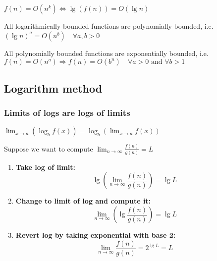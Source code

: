 \documentclass{article}
\begin{document}
\begin{theorem}
    $f(n) = O(n^k) \Leftrightarrow \lg(f(n)) = O(\lg n)$
\end{theorem}

\begin{theorem}
    All logarithmically bounded functions are polynomially bounded, i.e. \((\lg n)^a = O(n^b) \quad \forall a, b > 0\)
\end{theorem}

\begin{theorem}
    All polynomially bounded functions are exponentially bounded, i.e. \( f(n) = O(n^a) \Rightarrow f(n) = O(b^n) \quad \forall a > 0 \text{ and } \forall b > 1\)
\end{theorem}

\subsection{Logarithm method}
\subsubsection{Limits of logs are logs of limits}
\begin{definition}
    $\lim_{x \to a} (\log_b f(x)) = \log_b \left( \lim_{x \to a} f(x) \right)$
\end{definition}

\begin{process}
    $\text{Suppose we want to compute } \lim_{n \to \infty} \frac{f(n)}{g(n)} = L$
    \begin{enumerate}
        \item \textbf{Take log of limit:}
        \begin{equation*}
            \lg \left( \lim_{n \to \infty} \frac{f(n)}{g(n)} \right) = \lg L
        \end{equation*}
        \item \textbf{Change to limit of log and compute it:}
        \begin{equation*}
            \lim_{n \to \infty} \left( \lg \frac{f(n)}{g(n)} \right) = \lg L 
        \end{equation*}
        \item \textbf{Revert log by taking exponential with base 2:}
        \begin{equation*}
            \lim_{n \to \infty} \frac{f(n)}{g(n)} = 2^{\lg L} = L
        \end{equation*}
    \end{enumerate}
\end{process}
\end{document}
